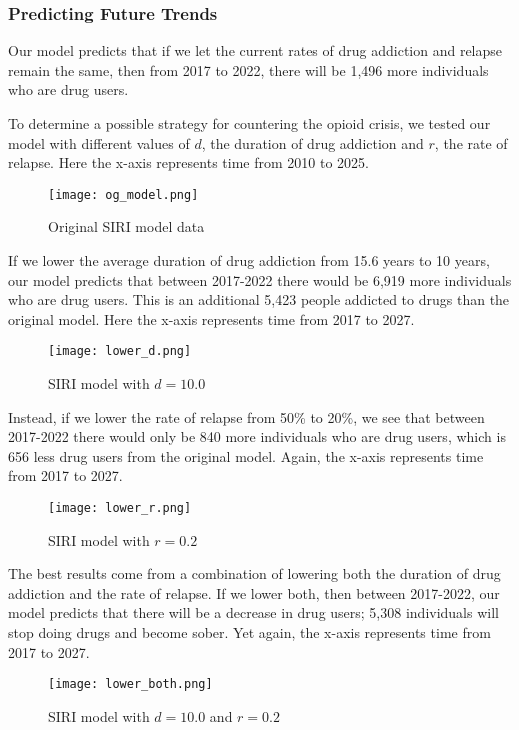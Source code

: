 \documentclass[12pt, letterpaper]{article}
\begin{document}
\subsubsection{Predicting Future Trends}
Our model predicts that if we let the current rates of drug addiction and relapse remain the same, then from 2017 to 2022, there will be 1,496 more individuals who are drug users.  

To determine a possible strategy for countering the opioid crisis, we tested our model with different values of $d$, the duration of drug addiction and $r$, the rate of relapse. Here the x-axis represents time from 2010 to 2025.
    \begin{figure}[H]
        \centering
        \texttt{[image: og\_model.png]}
        \caption{Original SIRI model data}
        \label{fig:og_model}
    \end{figure}

If we lower the average duration of drug addiction from 15.6 years to 10 years, our model predicts that between 2017-2022 there would be 6,919 more individuals who are drug users. This is an additional 5,423 people addicted to drugs than the original model. Here the x-axis represents time from 2017 to 2027.
    \begin{figure}[H]
        \centering
        \texttt{[image: lower\_d.png]}
        \caption{SIRI model with $d = 10.0$}
        \label{fig:lower_d}
    \end{figure}
    
Instead, if we lower the rate of relapse from 50\% to 20\%, we see that between 2017-2022 there would only be 840 more individuals who are drug users, which is 656 less drug users from the original model. Again, the x-axis represents time from 2017 to 2027.
    \begin{figure}[H]
        \centering
        \texttt{[image: lower\_r.png]}
        \caption{SIRI model with $r = 0.2$}
        \label{fig:lower_r}
    \end{figure}
    
The best results come from a combination of lowering both the duration of drug addiction and the rate of relapse. If we lower both, then between 2017-2022, our model predicts that there will be a decrease in drug users; 5,308 individuals will stop doing drugs and become sober. Yet again, the x-axis represents time from 2017 to 2027.
    \begin{figure}[H]
        \centering
        \texttt{[image: lower\_both.png]}
        \caption{SIRI model with $d = 10.0$ and $r = 0.2$}
        \label{fig:lower_both}
    \end{figure}
\end{document}
